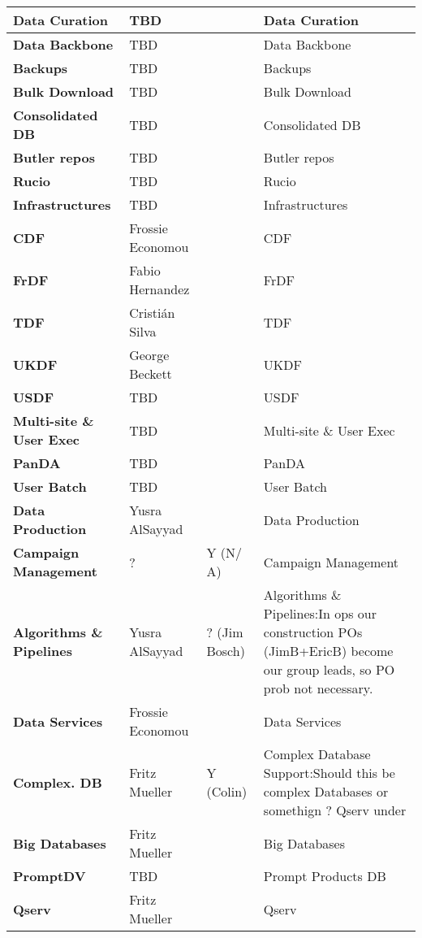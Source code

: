 \begin{longtable}{
p{}   |p{}|p{} |p{}|}
{\textbf{Data Curation}} & TBD &  & Data Curation \\ \hline
{\textbf{Data Backbone}} & TBD &  & Data Backbone \\ \hline
{\textbf{Backups}} & TBD &  & Backups \\ \hline
{\textbf{Bulk Download}} & TBD &  & Bulk Download \\ \hline
{\textbf{Consolidated DB}} & TBD &  & Consolidated DB \\ \hline
{\textbf{Butler repos}} & TBD &  & Butler repos \\ \hline
{\textbf{Rucio}} & TBD &  & Rucio \\ \hline
{\textbf{Infrastructures}} & TBD &  & Infrastructures \\ \hline
{\textbf{CDF}} & Frossie Economou &  & CDF \\ \hline
{\textbf{FrDF}} & Fabio Hernandez &  & FrDF \\ \hline
{\textbf{TDF}} & Cristián Silva &  & TDF \\ \hline
{\textbf{UKDF}} & George Beckett &  & UKDF \\ \hline
{\textbf{USDF}} & TBD &  & USDF \\ \hline
{\textbf{Multi-site \&  User Exec}} & TBD &  & Multi-site \&  User Exec \\ \hline
{\textbf{PanDA}} & TBD &  & PanDA \\ \hline
{\textbf{User Batch}} & TBD &  & User Batch \\ \hline
{\textbf{Data Production}} & Yusra AlSayyad &  & Data Production \\ \hline
{\textbf{Campaign Management}} & ? & Y (N/ A) & Campaign Management \\ \hline
{\textbf{Algorithms \&  Pipelines}} & Yusra AlSayyad & ? (Jim Bosch) & Algorithms \&  Pipelines:In ops our construction POs (JimB+EricB) become our group leads, so PO prob not necessary. \\ \hline
{\textbf{Data Services}} & Frossie Economou &  & Data Services \\ \hline
{\textbf{Complex. DB}} & Fritz Mueller & Y (Colin) & Complex Database Support:Should this be complex Databases or somethign ? Qserv under \\ \hline
{\textbf{Big Databases}} & Fritz Mueller &  & Big Databases \\ \hline
{\textbf{PromptDV}} & TBD &  & Prompt Products DB \\ \hline
{\textbf{Qserv}} & Fritz Mueller &  & Qserv \\ \hline

\end{longtable}
